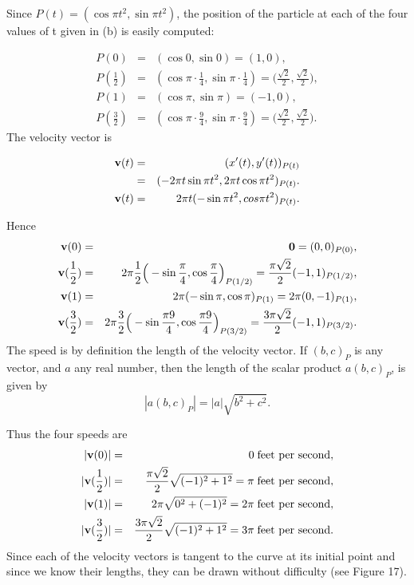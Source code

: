 \begin{example}
Since $P(t) = (\cos \pi t^2, \sin \pi t^2)$, the position of the particle at each of the four values of t given in (b) is easily computed:

\begin{eqnarray*}
              P(0) &=& (\cos 0, \sin 0) = (1, 0), \\
P(\frac{1}{2}) &=& (\cos \pi \cdot \frac{1}{4}, \sin \pi \cdot \frac{1}{4}) = \Big( \frac{\sqrt 2}{2}, \frac{\sqrt 2}{2} \Big) , \\
              P(1) &=& (\cos \pi, \sin \pi) = ( -1, 0),\\
P(\frac{3}{2}) &=& (\cos \pi \cdot \frac{9}{4}, \sin \pi \cdot \frac{9}{4}) = \Big( \frac{\sqrt 2}{2},  \frac{\sqrt 2}{2} \Big) .
\end{eqnarray*}
The velocity vector is

\begin{eqnarray*}
\mbox{\bf{v}}(t) &=& (x'(t),y'(t))_{P(t)}\\
      &=& (- 2\pi t \sin \pi t^2, 2\pi t \cos \pi t^2)_{P(t)}.\\
\mbox{\bf{v}}(t) &=& 2\pi t (-\sin \pi t^2, cos \pi t^2)_{P(t)} . 
\end{eqnarray*}
\setcounter{equation}{4}

\noindent Hence 
\begin{eqnarray*}
              \mbox{\bf{v}}(0) &=& \mbox{\bf{0}} = (0, 0)_{P(0)},\\
\mbox{\bf{v}}(\frac{1}{2}) &=& 2 \pi \frac{1}{2} \Big( -\sin \frac{\pi}{4}, \cos \frac{\pi}{4} \Big)_{P(1/2)} = \frac{\pi \sqrt 2}{2} (- 1, 1)_{P(1/2)},\\
              \mbox{\bf{v}}(1) &=& 2\pi (-\sin \pi, \cos \pi)_{P(1)} = 2 \pi (0, -1)_{P(1)},\\
\mbox{\bf{v}}(\frac{3}{2}) &=& 2\pi \frac{3}{2} \Big( -\sin \frac{\pi 9}{4}, \cos \frac{\pi 9}{4} \Big)_{P(3/2)} = \frac{3 \pi \sqrt 2}{2} (-1, 1)_{P(3/2)} .
\end{eqnarray*}
The speed is by definition the length of the velocity vector. If $(b, c)_P$ is any vector, and $a$ any real number, then the length of the scalar product $a(b, c)_P$, is given by
$$
|a(b, c)_P| = |a| \sqrt{b^2 + c^2} . 
$$

Thus the four speeds are 
\begin{eqnarray*}
|\mbox{\bf{v}}(0)| &=& 0 \;\mathrm{feet~per~second,} \\
|\mbox{\bf{v}}(\frac{1}{2})| &=& \frac{\pi \sqrt 2}{2} \sqrt{(-1)^2 + 1^2} = \pi \;\mathrm{feet~per~second,}\\
|\mbox{\bf{v}}(1)| &=& 2 \pi \sqrt{0^2 + (-1)^2} = 2\pi \;\mathrm{feet~per~ second,}\\
|\mbox{\bf{v}}(\frac{3}{2})| &=& \frac{3\pi \sqrt 2}{2} \sqrt{(-1 )^2 + 1^2} = 3 \pi \;\mathrm{feet~per~second.}
\end{eqnarray*}
Since each of the velocity vectors is tangent to the curve at its initial point and since we know their lengths, they can be drawn without difficulty (see Figure 17).


\end{example}
